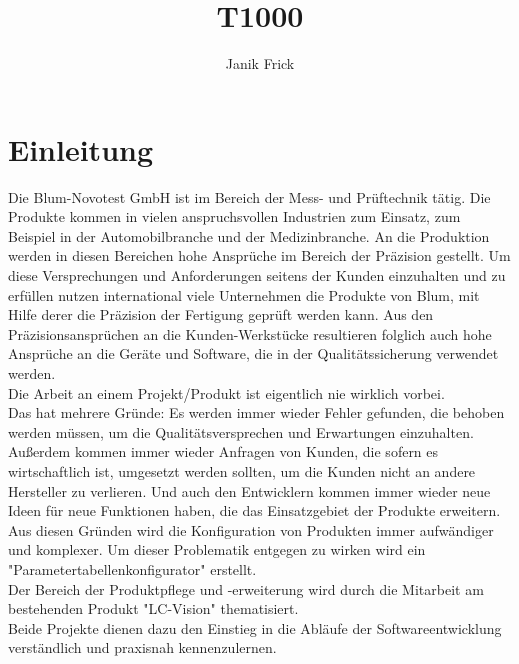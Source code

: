 \documentclass[10pt,a4paper]{article}
\author{Janik Frick}
\title{T1000}
\begin{document}

\tableofcontents
\newpage
\section{Einleitung}
Die Blum-Novotest GmbH ist im Bereich der Mess- und Prüftechnik tätig. Die Produkte kommen in vielen anspruchsvollen Industrien zum Einsatz, zum Beispiel in der Automobilbranche und der Medizinbranche. An die Produktion werden in diesen Bereichen hohe Ansprüche im Bereich der Präzision gestellt. Um diese Versprechungen und Anforderungen seitens der Kunden einzuhalten und zu erfüllen nutzen international viele Unternehmen die Produkte von Blum, mit Hilfe derer die Präzision der Fertigung geprüft werden kann. Aus den Präzisionsansprüchen an die Kunden-Werkstücke resultieren folglich auch hohe Ansprüche an die Geräte und Software, die in der Qualitätssicherung verwendet werden. \\
Die Arbeit an einem Projekt/Produkt ist eigentlich nie wirklich vorbei. 
\\Das hat mehrere Gründe: Es werden immer wieder Fehler gefunden, die behoben werden müssen, um die Qualitätsversprechen und Erwartungen einzuhalten. Außerdem kommen immer wieder Anfragen von Kunden, die sofern es wirtschaftlich ist, umgesetzt werden sollten, um die Kunden nicht an andere Hersteller zu verlieren. Und auch den Entwicklern kommen immer wieder neue Ideen für neue Funktionen haben, die das Einsatzgebiet der Produkte erweitern.\\
Aus diesen Gründen wird die Konfiguration von Produkten immer aufwändiger und komplexer. Um dieser Problematik entgegen zu wirken wird ein "Parametertabellenkonfigurator" erstellt.  
\\Der Bereich der Produktpflege und -erweiterung wird durch die Mitarbeit am bestehenden Produkt "LC-Vision" thematisiert.
\\Beide Projekte dienen dazu den Einstieg in die Abläufe der Softwareentwicklung verständlich und praxisnah kennenzulernen.
\newpage   
\end{document}
